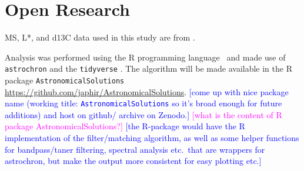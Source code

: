 \documentclass[draft]{agujournal2019}
\newcommand{\rez}{\textcolor{magenta}}
\newcommand{\ijk}{\textcolor{blue}}
\begin{document}


%
%

%

%



\section*{Open Research}

\Gls{MS}, \gls{L*}, and \gls{d13C} data used in this study are from .

Analysis was performed using the R programming language~\cite{RCoreTeam2024} and made use of \texttt{astrochron}  and the \texttt{tidyverse} .
The algorithm will be made available in the R package \texttt{AstronomicalSolutions} \url{https://github.com/japhir/AstronomicalSolutions}.
\ijk{[come up with nice package name (working title: \texttt{AstronomicalSolutions} so it's broad enough for future additions) and host on github/ archive on Zenodo.]}
\rez{[what is the content of R package AstronomicalSolutions?]}
\ijk{[the R-package would have the R implementation of the filter/matching
  algorithm, as well as some helper functions for bandpass/taner filtering,
  spectral analysis etc.\ that are wrappers for astrochron, but make the output
  more consistent for easy plotting etc.]}
\end{document}
